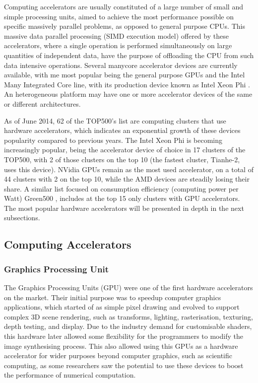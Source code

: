 Computing accelerators are usually constituted of a large number of small and simple processing units, aimed to achieve the most performance possible on specific massively parallel problems, as opposed to general purpose CPUs. This massive data parallel processing (SIMD execution model) offered by these accelerators, where a single operation is performed simultaneously on large quantities of independent data, have the purpose of offloading the CPU from such data intensive operations. Several manycore accelerator devices are currently available, with me most popular being the general purpose GPUs and the Intel Many Integrated Core line, with its production device known as Intel Xeon Phi \cite{Intel:MIC}. An heterogeneous platform may have one or more accelerator devices of the same or different architectures.

As of June 2014, 62 of the TOP500’s list \cite{TOP500} are computing clusters that use hardware accelerators, which indicates an exponential growth of these devices popularity compared to previous years. The Intel Xeon Phi is becoming increasingly popular, being the accelerator device of choice in 17 clusters of the TOP500, with 2 of those clusters on the top 10 (the fastest cluster, Tianhe-2, uses this device). NVidia GPUs remain as the most used accelerator, on a total of 44 clusters with 2 on the top 10, while the AMD devices are steadily losing their share. A similar list focused on consumption efficiency (computing power per Watt) Green500 \cite{GREEN500}, includes at the top 15 only clusters with \nvidia GPU accelerators. The most popular hardware accelerators will be presented in depth in the next subsections.

\subsection{Computing Accelerators}
\label{hardware}

\subsubsection*{Graphics Processing Unit}
\label{gpu}

The Graphics Processing Units (GPU) were one of the first hardware accelerators on the market. Their initial purpose was to speedup computer graphics applications, which started of as simple pixel drawing and evolved to support complex 3D scene rendering, such as transforms, lighting, rasterisation, texturing, depth testing, and display. Due to the industry demand for customisable shaders, this hardware later allowed some flexibility for the programmers to modify the image synthesising process. This also allowed using this GPUs as a hardware accelerator for wider purposes beyond computer graphics, such as scientific computing, as some researchers saw the potential to use these devices to boost the performance of numerical computation.


